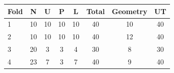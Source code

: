 \begin{tabular}{lccccccc}
\toprule
Fold & N & U & P & L & Total & Geometry & UT \\
\midrule
1 & 10 & 10 & 10 & 10 & 40 & 10 & 40 \\
2 & 10 & 10 & 10 & 10 & 40 & 12 & 40 \\
3 & 20 & 3 & 3 & 4 & 30 & 8 & 30 \\
4 & 23 & 7 & 3 & 7 & 40 & 9 & 40 \\
\bottomrule
\end{tabular}